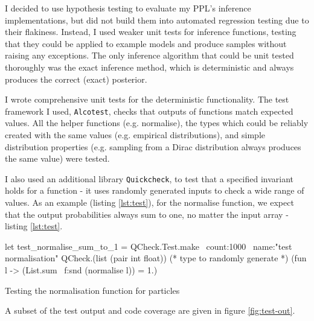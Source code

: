 I decided to use hypothesis testing to evaluate my PPL's inference implementations, but did not build them into automated regression testing due to their flakiness. Instead, I used weaker unit tests for inference functions, testing that they could be applied to example models and produce samples without raising any exceptions. The only inference algorithm that could be unit tested thoroughly was the exact inference method, which is deterministic and always produces the correct (exact) posterior.
			
I wrote comprehensive unit tests for the deterministic functionality. The test framework I used, \texttt{Alcotest}, checks that outputs of functions match expected values. All the helper functions (e.g. normalise), the types which could be reliably created with the same values (e.g. empirical distributions), and simple distribution properties (e.g. sampling from a Dirac distribution always produces the same value) were tested.
			
I also used an additional library \texttt{Quickcheck}, to test that a specified invariant holds for a function - it uses randomly generated inputs to check a wide range of values. As an example (listing \ref{lst:test}), for the normalise function, we expect that the output probabilities always sum to one, no matter the input array - listing \ref{lst:test}.
				
			\begin{listing}[!htb]
				\centering
				\begin{ocamlcode-in} 
					let test_normalise_sum_to_1 =
					QCheck.Test.make ~count:1000 ~name:"test normalisation"
					QCheck.(list (pair int float)) (* type to randomly generate *)
					(fun l -> (List.sum ~f:snd (normalise l)) = 1.)
				\end{ocamlcode-in}
				\caption{Testing the normalisation function for particles}
				\label{lst:test}
			\end{listing}
				
A subset of the test output and code coverage are given in figure \ref{fig:test-out}.
			

